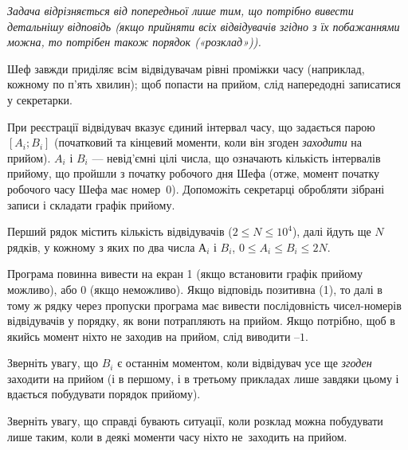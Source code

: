 ﻿{\it Задача відрізняється від попередньої \emph{лише} тим, що потрібно вивести детальнішу відповідь (якщо прийняти всіх відвідувачів згідно з їх побажаннями можна, то потрібен також порядок («розклад»)).}

Шеф завжди приділяє всім відвідувачам рівні проміжки часу (наприклад, кожному по п'ять хвилин); щоб попасти на прийом, слід напередодні записатися у секретарки.

При реєстрації відвідувач вказує єдиний інтервал часу, що задається парою $[A_i; B_i]$ (початковий та кінцевий моменти, коли він згоден \emph{заходити} на прийом). $A_i$ і $B_i$ --- невід’ємні цілі числа, що означають кількість інтервалів прийому, що пройшли з початку робочого дня Шефа (отже, момент початку робочого часу Шефа має номер~0). Допоможіть секретарці обробляти зібрані записи і складати графік прийому.

\InputFile
Перший рядок містить кількість відвідувачів ($2\leqslant N\leqslant 10^4$), далі йдуть ще $N$ рядків, у кожному з яких по два числа $А_i$ і $B_i$, $0\leqslant A_i\leqslant B_i\leqslant 2N$.

\OutputFile
Програма повинна вивести на екран 1 (якщо встановити графік прийому можливо), або 0 (якщо неможливо). Якщо відповідь позитивна (1), то далі в тому ж рядку через пропуски програма має вивести послідовність чисел-номерів відвідувачів у порядку, як вони потрапляють на прийом. Якщо потрібно, щоб в якийсь момент ніхто не заходив на прийом, слід виводити $–1$.


\Examples
\begin{example}
\end{example}

\Note
Зверніть увагу, що $B_i$ є останнім моментом, коли відвідувач усе ще \emph{згоден} заходити на прийом (і в першому, і в третьому прикладах лише завдяки цьому і вдається побудувати порядок прийому).

Зверніть увагу, що справді бувають ситуації, коли розклад можна побудувати лише таким, коли в деякі моменти часу ніхто не~заходить на прийом.
